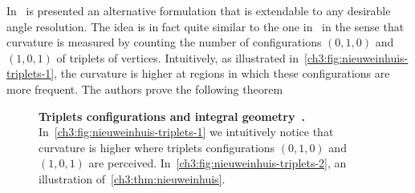 In~\cite{nieuwenhuis14efficient} is presented an alternative formulation that is extendable to any desirable angle resolution. The idea is in fact quite similar to the one in~\cite{zehiry10fast} in the sense that curvature is measured by counting the number of configurations $(0,1,0)$ and $(1,0,1)$ of triplets of vertices. Intuitively, as illustrated in~\cref{ch3:fig:nieuweinhuis-triplets-1}, the curvature is higher at regions in which these configurations are more frequent. The authors prove the following theorem

\begin{figure}
\center
{}
\caption{\textbf{Triplets configurations and integral geometry~\cite{nieuwenhuis14efficient}.} In~\cref{ch3:fig:nieuweinhuis-triplets-1} we intuitively notice that curvature is higher where triplets configurations $(0,1,0)$ and $(1,0,1)$ are perceived. In~\cref{ch3:fig:nieuweinhuis-triplets-2}, an illustration of~\cref{ch3:thm:nieuweinhuis}. }
\label{ch3:fig:nieuweinhuis-triplets}
\end{figure}

